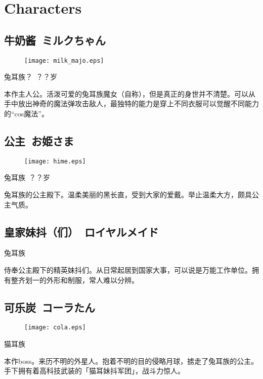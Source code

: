 \documentclass{article}
\begin{document}
\section{Characters}

\subsection{牛奶酱\ ミルクちゃん}

\begin{figure}[H]
\centering
\texttt{[image: milk\_majo.eps]}
\end{figure}

兔耳族？\ ？？岁

本作主人公。活泼可爱的兔耳族魔女（自称），但是真正的身世并不清楚。可以从手中放出神奇的魔法弹攻击敌人，最独特的能力是穿上不同衣服可以觉醒不同能力的“cos魔法”。

\subsection{公主\ お姫さま}

\begin{figure}[H]
\centering
\texttt{[image: hime.eps]}
\end{figure}

兔耳族\ ？？岁

兔耳族的公主殿下。温柔美丽的黑长直，受到大家的爱戴。举止温柔大方，颇具公主气质。

\subsection{皇家妹抖（们）\ ロイヤルメイド}

兔耳族

侍奉公主殿下的精英妹抖们。从日常起居到国家大事，可以说是万能工作单位。拥有整齐划一的外形和制服，常人难以分辨。

\subsection{可乐炭\ コーラたん}

\begin{figure}[H]
\centering
\texttt{[image: cola.eps]}
\end{figure}

猫耳族

本作boss。来历不明的外星人。抱着不明的目的侵略月球，掳走了兔耳族的公主。手下拥有着高科技武装的「猫耳妹抖军团」，战斗力惊人。
\end{document}
